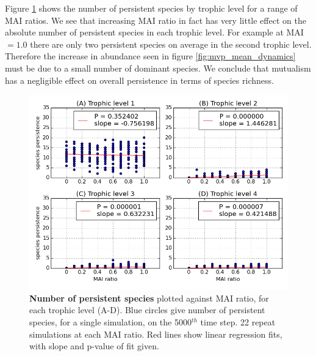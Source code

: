 Figure \ref{fig:mvp_species_per_tl} shows the number of persistent species by trophic level for a range of MAI ratios. We see that increasing MAI ratio in fact has very little effect on the absolute number of persistent species in each trophic level. For example at MAI$=1.0$ there are only two persistent species on average in the second trophic level. Therefore the increase in abundance seen in figure \ref{fig:mvp_mean_dynamics} must be due to a small number of dominant species. We conclude that mutualism has a negligible effect on overall persistence in terms of species richness.



\begin{figure}
	\centering
	\includegraphics[width=0.8\linewidth]{"figures/persistence/species_richness_per_trophic_level"}
	\caption{\textbf{Number of persistent species} plotted against MAI ratio, for each trophic level (A-D). Blue circles give number of persistent species, for a single simulation, on the 5000$^{th}$ time step. 22 repeat simulations at each MAI ratio. Red lines show linear regression fits, with slope and p-value of fit given.}
	\label{fig:mvp_species_per_tl}
\end{figure}

